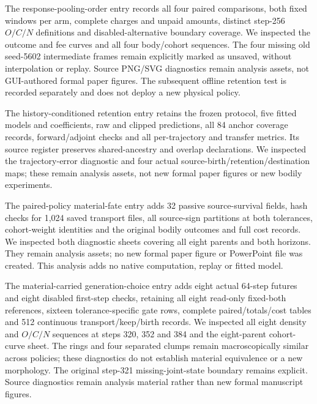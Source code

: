 The response-pooling-order entry records all four paired comparisons, both fixed windows per arm, complete charges and unpaid amounts, distinct step-256 $O/C/N$ definitions and disabled-alternative boundary coverage. We inspected the outcome and fee curves and all four body/cohort sequences. The four missing old seed-5602 intermediate frames remain explicitly marked as unsaved, without interpolation or replay. Source PNG/SVG diagnostics remain analysis assets, not GUI-authored formal paper figures. The subsequent offline retention test is recorded separately and does not deploy a new physical policy.

The history-conditioned retention entry retains the frozen protocol, five fitted models and coefficients, raw and clipped predictions, all 84 anchor coverage records, forward/adjoint checks and all per-trajectory and transfer metrics. Its source register preserves shared-ancestry and overlap declarations. We inspected the trajectory-error diagnostic and four actual source-birth/retention/destination maps; these remain analysis assets, not new formal paper figures or new bodily experiments.

The paired-policy material-fate entry adds 32 passive source-survival fields, hash checks for 1,024 saved transport files, all source-sign partitions at both tolerances, cohort-weight identities and the original bodily outcomes and full cost records. We inspected both diagnostic sheets covering all eight parents and both horizons. They remain analysis assets; no new formal paper figure or PowerPoint file was created. This analysis adds no native computation, replay or fitted model.

The material-carried generation-choice entry adds eight actual 64-step futures and eight disabled first-step checks, retaining all eight read-only fixed-both references, sixteen tolerance-specific gate rows, complete paired/totals/cost tables and 512 continuous transport/keep/birth records. We inspected all eight density and $O/C/N$ sequences at steps 320, 352 and 384 and the eight-parent cohort-curve sheet. The rings and four separated clumps remain macroscopically similar across policies; these diagnostics do not establish material equivalence or a new morphology. The original step-321 missing-joint-state boundary remains explicit. Source diagnostics remain analysis material rather than new formal manuscript figures.

